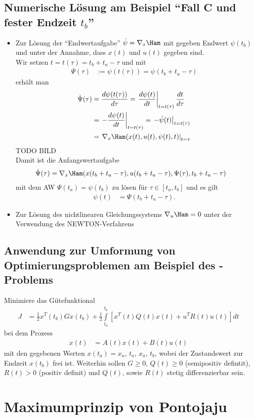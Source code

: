 \subsection{Numerische Lösung am Beispiel "`Fall C und fester Endzeit $t_b$"'}
\begin{itemize}
  \item Zur Lösung der "`Endwertaufgabe"' $\dot{\psi}=\nabla_x \Ham$ mit gegeben Endwert $\psi(t_b)$ und unter der Annahme, dass $x(t)$ und $u(t)$ gegeben sind.\\
  		Wir setzen $t=t(\tau)=t_b+t_a-\tau$ und mit 
  		\begin{align*}
  			\Psi(\tau) & := \psi(t(\tau)) = \psi(t_b+t_a-\tau)
  		\end{align*}
  		erhält man 
  		\begin{align*}
  			\dot{\Psi}(\tau) & = \frac{d\psi(t(\tau))}{d\tau} = \left.\frac{d\psi(t)}{dt}\right|_{t=t(\tau)}\frac{dt}{d\tau}\\
  			& = \left.-\frac{d\psi(t)}{dt}\right|_{t=t(\tau)}=\left.-\dot{\psi}(t)\right|_{t=t(\tau)}\\
  			& = \left.\nabla_x \Ham(x(t),u(t),\psi(t),t)\right|_{t=\tau}
  		\end{align*}
  		TODO BILD\\
  		Damit ist die Anfangswertaufgabe 
  		\begin{align*}
  			\dot{\Psi}(\tau) & = \nabla_x \Ham(x(t_b+t_a-\tau),u(t_b+t_a-\tau),\Psi(\tau),t_b+t_a-\tau)
  		\end{align*}
  		mit dem \ac{AW} $\Psi(t_a)=\psi(t_b)$ zu lösen für $\tau\in[t_a,t_b]$ und es gilt
  		\begin{align*}
  		\psi(t) & = \Psi(t_b+t_a-\tau).
  		\end{align*}
  \item Zur Lösung des nichtlinearen Gleichungssystems $\nabla_u \Ham =0$ unter der Verwendung des NEWTON-Verfahrens
\end{itemize}

\subsection{Anwendung zur Umformung von Optimierungsproblemen am Beispiel des -Problems}
Minimiere das Gütefunktional
\begin{align*}
	J  & = \frac12 x^T(t_b)Gx(t_b)+\frac12\int\limits_{t_a}^{t_b}\left[x^T(t)Q(t)x(t)+u^TR(t)u(t)\right]dt
\end{align*}
bei dem Prozess 
\begin{align*}
	\dot{x}(t) & = A(t)x(t)+B(t)u(t)
\end{align*}
mit den gegebenen Werten $x(t_a)=x_a$, $t_a$, $x_a$, $t_b$, wobei der Zustandswert zur Endzeit $x(t_b)$ frei ist. Weiterhin sollen $G\ge 0$, $Q(t)\ge 0$ (semipositiv defintit), $R(t)>0$
(positiv definit) und $Q(t)$, sowie $R(t)$ stetig differenzierbar sein.

\section{Maximumprinzip von Pontojaju}
